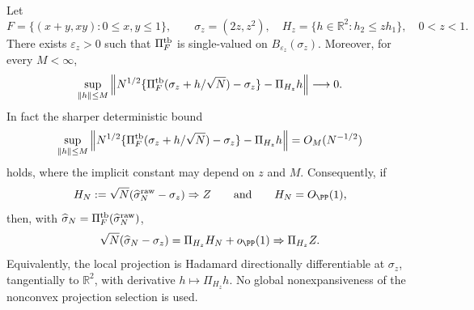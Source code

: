 \begin{lemma}\label{lem:exchange-diagonal-local-reach-before-main}
Let
\[
F=\{(x+y,xy):0\le x,y\le1\},\qquad
\sigma_z=(2z,z^2),\quad
H_z=\{h\in\mathbb R^2:h_2\le zh_1\},\quad 0<z<1.
\]
There exists \(\varepsilon_z>0\) such that \(\Pi_F^{\rm tb}\) is single-valued
on \(B_{\varepsilon_z}(\sigma_z)\).  Moreover, for every \(M<\infty\),
\begin{equation}\label{eq:exchange-diagonal-local-projection-rate-main}
\sup_{\|h\|\le M}\left\|
N^{1/2}\{\Pi_F^{\rm tb}(\sigma_z+h/\sqrt N)-\sigma_z\}
-\Pi_{H_z}h\right\|\longrightarrow0.
\end{equation}
In fact the sharper deterministic bound
\begin{equation}\label{eq:explicit-local-projection-expansion-main}
\sup_{\|h\|\le M}\left\|
N^{1/2}\{\Pi_F^{\rm tb}(\sigma_z+h/\sqrt N)-\sigma_z\}
-\Pi_{H_z}h\right\|=O_M(N^{-1/2})
\end{equation}
holds, where the implicit constant may depend on \(z\) and \(M\).
Consequently, if
\[
H_N:=\sqrt N(\widehat\sigma_N^{\rm raw}-\sigma_z)\Rightarrow Z
\qquad\text{and}\qquad H_N=O_{\PP}(1),
\]
then, with
\(\widehat\sigma_N=\Pi_F^{\rm tb}(\widehat\sigma_N^{\rm raw})\),
\[
\sqrt N(\widehat\sigma_N-\sigma_z)
=\Pi_{H_z}H_N+o_{\PP}(1)
\Rightarrow \Pi_{H_z}Z .
\]
Equivalently, the local projection is Hadamard directionally differentiable at
\(\sigma_z\), tangentially to \(\mathbb R^2\), with derivative
\(h\mapsto\Pi_{H_z}h\).  No global nonexpansiveness of the nonconvex
projection selection is used.
\end{lemma}

